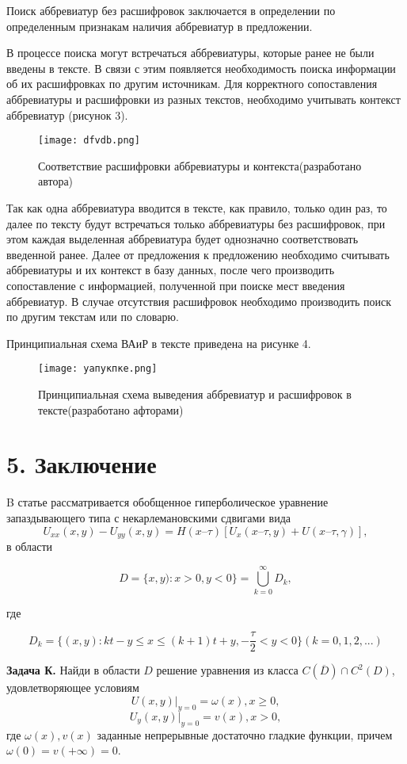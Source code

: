 \documentclass{article}
\begin{document}
Поиск аббревиатур без расшифровок заключается в определении по определенным признакам наличия аббревиатур в предложении.

В процессе поиска могут встречаться аббревиатуры, которые ранее не были введены в тексте. В связи с этим появляется необходимость поиска информации об их расшифровках по другим источникам. Для корректного сопоставления аббревиатуры и расшифровки из разных текстов, необходимо учитывать контекст аббревиатур (рисунок 3).
\begin{figure}[H]
    \centering
    \texttt{[image: dfvdb.png]}
    \caption{Соответствие расшифровки аббревиатуры и контекста(разработано автора)}
    \label{fig:enter-label}
\end{figure}


Так как одна аббревиатура вводится в тексте, как правило, только один раз, то далее по тексту будут встречаться только аббревиатуры без расшифровок, при этом каждая выделенная аббревиатура будет однозначно соответствовать введенной ранее. Далее от предложения к предложению необходимо считывать аббревиатуры и их контекст в базу данных, после чего производить сопоставление с информацией, полученной при поиске мест введения
\newpage
аббревиатур. В случае отсутствия расшифровок необходимо производить поиск по другим текстам или по словарю.

Принципиальная схема ВАиР в тексте приведена на рисунке 4.
\begin{figure}[H]
    \centering
    \texttt{[image: уапукпке.png]}
    \caption{Принципиальная схема выведения аббревиатур и расшифровок в тексте(разработано афторами)}
    \label{fig:enter-label}
\end{figure}
\section*{5. Заключение}
B статье рассматривается обобщенное гиперболическое уравнение запаздывающего типа с некарлемановскими сдвигами вида
\begin{equation}
U_{xx}(x,y)-U_{yy}(x,y) = H(x – \tau)[U_x(x – \tau,y) + U(x – \tau,\gamma)],
\end{equation}
в области

\[D = \{x,y): x > 0,y < 0\} = \bigcup_{k=0}^{\infty} D_k,\]

где

\[D_k = \{(x,y): kt -y \leq x \leq (k + 1)t +y, -\frac{\tau}{2} < y < 0\} (k = 0,1,2,...)\]

\textbf{Задача К.} Найди в области $D$ решение уравнения из класса $C(\overline{D}) \cap C^2(D)$, удовлетворяющее условиям
\begin{equation}
U(x,y)|_{y=0} = \omega(x), x \geq 0,
\end{equation}
\newpage
\begin{equation}
U_y(x,y)|_{y=0} = v(x), x > 0,
\end{equation}
где $\omega(x), v(x)$ заданные непрерывные достаточно гладкие функции, причем $\omega(0) = v(+\infty) = 0$.
\end{document}
